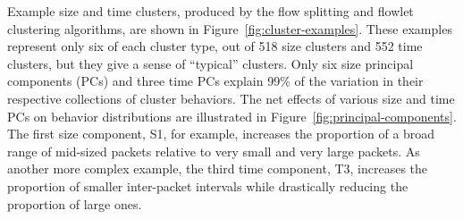 \documentclass[conference]{IEEEtran}
\newcommand{\caps}[1]{{\small{#1}}}
\begin{document}
Example size and time clusters, produced by the flow splitting and flowlet clustering algorithms, are shown in Figure~\ref{fig:cluster-examples}. These examples represent only six of each cluster type, out of 518 size clusters and 552 time clusters, but they give a sense of ``typical'' clusters.
Only six size principal components (\caps{PC}s) and three time \caps{PC}s explain 99\% of the variation in their respective collections of cluster behaviors. The net effects of various size and time \caps{PC}s on behavior distributions are illustrated in Figure~\ref{fig:principal-components}.
The first size component, \caps{S1}, for example, increases the proportion of a broad range of mid-sized packets relative to very small and very large packets. As another more complex example, the third time component, \caps{T3}, increases the proportion of smaller inter-packet intervals while drastically reducing the proportion of large ones. %
\end{document}
